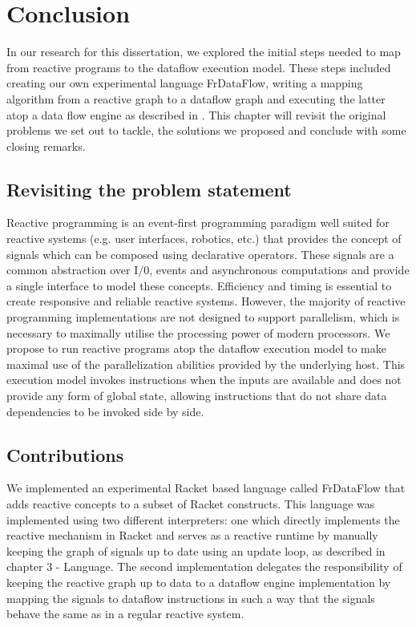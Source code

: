 \chapter{Conclusion}

In our research for this dissertation, we explored the initial steps needed to map from reactive programs to the dataflow execution model. 
These steps included creating our own experimental language FrDataFlow, writing a mapping algorithm from a reactive graph to a dataflow graph and executing the latter atop a data flow engine as described in \cite{saey_extensible_2017}. This chapter will revisit the original problems we set out to tackle, the solutions we proposed and conclude with some closing remarks. 

\section{Revisiting the problem statement}

Reactive programming is an event-first programming paradigm well suited for reactive systems (e.g. user interfaces, robotics, etc.) that provides the concept of signals which can be composed using declarative operators.
These signals are a common abstraction over I/0, events and asynchronous computations and provide a single interface to model these concepts.
Efficiency and timing is essential to create responsive and reliable reactive systems. However, the majority of reactive programming implementations are not designed to support parallelism, which is necessary to maximally utilise the processing power of modern processors. We propose to run reactive programs atop the dataflow execution model to make maximal use of the parallelization abilities provided by the underlying host. This execution model invokes instructions when the inputs are available and does not provide any form of global state, allowing instructions that do not share data dependencies to be invoked side by side. 

\section{Contributions}

We implemented an experimental Racket based language called FrDataFlow that adds reactive concepts to a subset of Racket constructs. This language was implemented using two different interpreters: one which directly implements the reactive mechanism in Racket and serves as a reactive runtime by manually keeping the graph of signals up to date using an update loop, as described in chapter 3 - Language.
The second implementation delegates the responsibility of keeping the reactive graph up to data to a dataflow engine implementation by mapping the signals to dataflow instructions in such a way that the signals behave the same as in a regular reactive system. 

